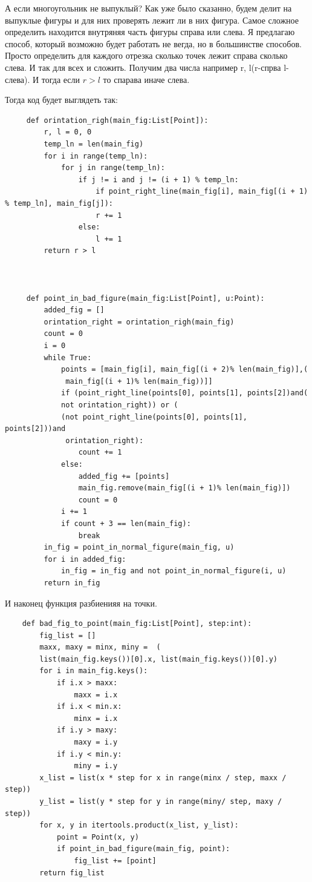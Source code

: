 \documentclass[12pt]{article} %
\begin{document}
 	 \hspace*{1cm}А если многоугольник не выпуклый? Как уже было сказанно, будем делит на выпуклые фигуры и для них проверять лежит ли в них фигура. Самое сложное определить находится внутряняя часть фигуры справа или слева. Я предлагаю способ, который возможно будет работать не вегда, но в большинстве способов. Просто определить для каждого отрезка сколько точек лежит справа сколько слева. И так для всех и сложить. Получим два числа например r, l(r-спрва l-слева). И тогда если $r>l$ то спарава иначе слева. \par
 	 Тогда код будет выглядеть так:
 	 \begin{verbatim}
 	 def orintation_righ(main_fig:List[Point]):
 	     r, l = 0, 0
     	 temp_ln = len(main_fig)
 	     for i in range(temp_ln):
 	         for j in range(temp_ln):
 	             if j != i and j != (i + 1) % temp_ln:
 	                 if point_right_line(main_fig[i], main_fig[(i + 1) % temp_ln], main_fig[j]):
 	                 r += 1
 	             else:
 	                 l += 1
 	     return r > l
 	 
 	 
 	 
 	 def point_in_bad_figure(main_fig:List[Point], u:Point):
 	     added_fig = []
 	     orintation_right = orintation_righ(main_fig)
 	     count = 0
 	     i = 0
 	     while True:
 	         points = [main_fig[i], main_fig[(i + 2)% len(main_fig)],(
 	          main_fig[(i + 1)% len(main_fig))]]
 	         if (point_right_line(points[0], points[1], points[2])and(
 	         not orintation_right)) or (
 	         (not point_right_line(points[0], points[1], points[2]))and
 	          orintation_right):
 	             count += 1
 	         else:
 	             added_fig += [points]
 	             main_fig.remove(main_fig[(i + 1)% len(main_fig)])
 	             count = 0
 	         i += 1
 	         if count + 3 == len(main_fig):     
 	             break
 	     in_fig = point_in_normal_figure(main_fig, u)
 	     for i in added_fig:
 	         in_fig = in_fig and not point_in_normal_figure(i, u)
 	     return in_fig
 	\end{verbatim}
 	\hspace*{1cm}И наконец функция разбиенияя на точки.
 	\begin{verbatim}
 	def bad_fig_to_point(main_fig:List[Point], step:int):
 	    fig_list = []
 	    maxx, maxy = minx, miny =  (
 	    list(main_fig.keys())[0].x, list(main_fig.keys())[0].y)
 	    for i in main_fig.keys():
 	        if i.x > maxx:
 	            maxx = i.x
 	        if i.x < min.x:
 	            minx = i.x
 	        if i.y > maxy:
 	            maxy = i.y
 	        if i.y < min.y:
 	            miny = i.y
 	    x_list = list(x * step for x in range(minx / step, maxx / step))
 	    y_list = list(y * step for y in range(miny/ step, maxy / step))
 	    for x, y in itertools.product(x_list, y_list):
 	        point = Point(x, y)
 	        if point_in_bad_figure(main_fig, point):
 	            fig_list += [point]
 	    return fig_list
 	\end{verbatim}
\end{document}
